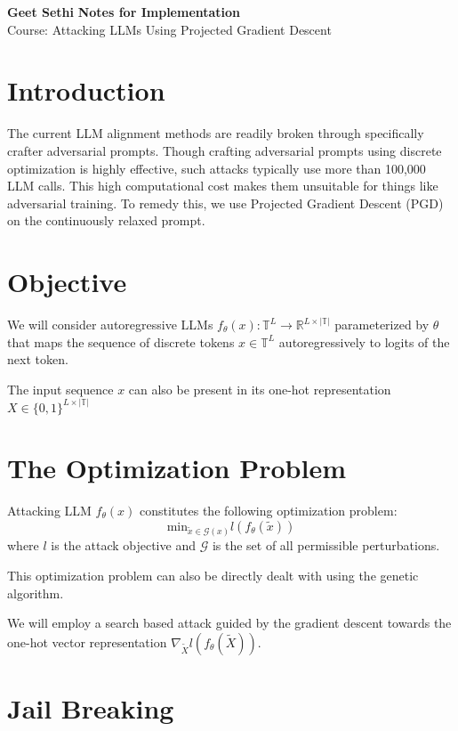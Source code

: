 \documentclass[a4paper, 11pt]{article}
\newcommand{\nt}[2]{\begin{note}{#1}{}#2\end{note}}
\begin{document}
\textsf{\noindent \large\textbf{Geet Sethi} \hfill \textbf{Notes for Implementation} \\
    \normalsize Course: Attacking LLMs Using Projected Gradient Descent}

\section{Introduction}

The current LLM alignment methods are readily broken through specifically crafter adversarial prompts. Though crafting adversarial prompts using discrete optimization is highly effective, such attacks typically use more than 100,000 LLM calls. This high computational cost makes them unsuitable for things like adversarial training. To remedy this, we use Projected Gradient Descent (PGD) on the continuously relaxed prompt.

\section{Objective}

We will consider autoregressive LLMs $f_\theta(x) : \mathbb{T}^L \rightarrow \mathbb{R}^{L \times \lvert \mathbb{T} \rvert}$ parameterized by $\theta$ that maps the sequence of discrete tokens $x \in \mathbb{T}^L$ autoregressively to logits of the next token.
\nt{The input sequence $x$ can also be present in its one-hot representation $X \in \{0, 1\}^{L \times \lvert \mathbb{T} \rvert}$}{}

\section{The Optimization Problem}
Attacking LLM $f_\theta(x)$ constitutes the following optimization problem:
\begin{equation}
  \textrm{min}_{\tilde{x} \in \mathcal{G}(x)} l(f_\theta(\tilde{x}))
\end{equation}
where $l$ is the attack objective and $\mathcal{G}$ is the set of all permissible perturbations.

\nt{This optimization problem can also be directly dealt with using the genetic algorithm.}{}

We will employ a search based attack guided by the gradient descent towards the one-hot vector representation $\nabla_{\tilde{X}} l(f_\theta(\tilde{X}))$.

\section{Jail Breaking}
\end{document}
